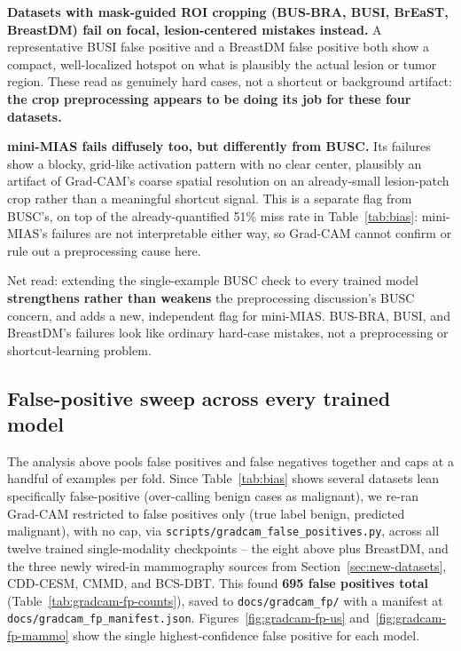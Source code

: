 \documentclass[11pt]{article}
\begin{document}
\textbf{Datasets with mask-guided ROI cropping (BUS-BRA, BUSI, BrEaST,
BreastDM) fail on focal, lesion-centered mistakes instead.} A
representative BUSI false positive and a BreastDM false positive both show
a compact, well-localized hotspot on what is plausibly the actual lesion
or tumor region. These read as genuinely hard cases, not a shortcut or
background artifact: \textbf{the crop preprocessing appears to be doing
its job for these four datasets.}

\textbf{mini-MIAS fails diffusely too, but differently from BUSC.} Its
failures show a blocky, grid-like activation pattern with no clear center,
plausibly an artifact of Grad-CAM's coarse spatial resolution on an
already-small lesion-patch crop rather than a meaningful shortcut signal.
This is a separate flag from BUSC's, on top of the already-quantified 51\%
miss rate in Table~\ref{tab:bias}: mini-MIAS's failures are not
interpretable either way, so Grad-CAM cannot confirm or rule out a
preprocessing cause here.

Net read: extending the single-example BUSC check to every trained model
\textbf{strengthens rather than weakens} the preprocessing discussion's
BUSC concern, and adds a new, independent flag for mini-MIAS. BUS-BRA,
BUSI, and BreastDM's failures look like ordinary hard-case mistakes, not a
preprocessing or shortcut-learning problem.

\subsection{False-positive sweep across every trained model}
\label{sec:gradcam-fp}

The analysis above pools false positives and false negatives together and
caps at a handful of examples per fold. Since Table~\ref{tab:bias} shows
several datasets lean specifically false-positive (over-calling benign
cases as malignant), we re-ran Grad-CAM restricted to false positives only
(true label benign, predicted malignant), with no cap, via
\texttt{scripts/gradcam\_false\_positives.py}, across all twelve trained
single-modality checkpoints -- the eight above plus BreastDM, and the three
newly wired-in mammography sources from
Section~\ref{sec:new-datasets}, CDD-CESM, CMMD, and BCS-DBT. This found
\textbf{695 false positives total} (Table~\ref{tab:gradcam-fp-counts}),
saved to \texttt{docs/gradcam\_fp/} with a manifest at
\texttt{docs/gradcam\_fp\_manifest.json}. Figures~\ref{fig:gradcam-fp-us}
and~\ref{fig:gradcam-fp-mammo} show the single highest-confidence false
positive for each model.
\end{document}
